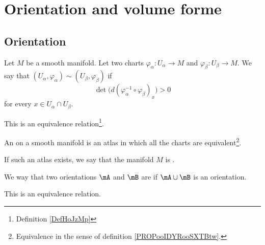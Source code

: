 

\section{Orientation and volume forme}

\subsection{Orientation}


\begin{propositionDef}		\label{PROPooIDYRooSXTBtw}		\label{DEFooGMOQooVzqFxy}
	Let \( M\) be  a smooth manifold. Let two charts \(\varphi_{\alpha} \colon  U_{\alpha}\to M  \) and \(\varphi_{\beta} \colon U_{\beta}\to M  \). We say that \( (U_{\alpha}, \varphi_{\alpha})\sim (U_{\beta}, \varphi_{\beta})\) if
	\begin{equation}
		\det\big( d(\varphi_{\alpha}^{-1}\circ \varphi_{\beta})_x \big)>0
	\end{equation}
	for every \( x\in U_{\alpha}\cap U_{\beta}\).

	This is an equivalence relation\footnote{Definition \ref{DefHoJzMp}}.
\end{propositionDef}

\begin{definition}		\label{DEFooAQPOooJeSRAt}	\label{DEFooQZJPooOwMbim}
	An  on a smooth manifold is an atlas in which all the charts are equivalent\footnote{Equivalence in the sense of definition \ref{PROPooIDYRooSXTBtw}.}.

	If such an atlas exists, we say that the manifold \( M\) is .
\end{definition}




\begin{propositionDef}		\label{PROPooMKHKooUTiUjF}
	We way that two orientations \( \mA\) and \( \mB\) are  if \( \mA\cup\mB\) is an orientation.

	This is an equivalence relation.
\end{propositionDef}


